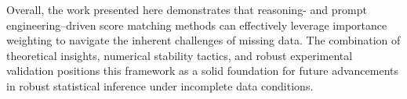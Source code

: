 \documentclass{article}
\begin{document}
Overall, the work presented here demonstrates that reasoning- and prompt engineering–driven score matching methods can effectively leverage importance weighting to navigate the inherent challenges of missing data. The combination of theoretical insights, numerical stability tactics, and robust experimental validation positions this framework as a solid foundation for future advancements in robust statistical inference under incomplete data conditions.



\end{document}
